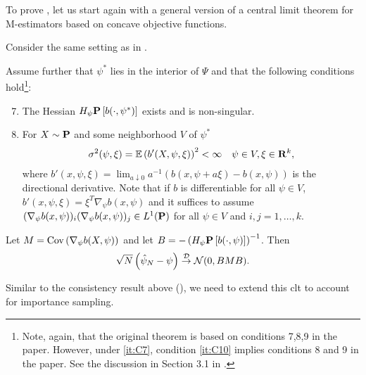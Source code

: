 To prove , let us start again with a general version of a central limit theorem for M-estimators based on concave objective functions. 
\begin{theorem}
    \label{thm:haberman-clt}
    Consider the same setting as in . 

    Assume further that $\psi^{\ast}$ lies in the interior of $\Psi$ and that the following conditions hold\footnote{Note, again, that the original theorem is based on conditions 7,8,9 in the paper. However, under \ref{it:C7}, condition \ref{it:C10} implies conditions 8 and 9 in the paper. See the discussion in Section 3.1 in \citep{Haberman1989Concavity}.}: 
    \begin{enumerate}[label=(C\arabic*),ref=(C\arabic*)]
        \setcounter{enumi}{6}
        \item\label{it:C7} The Hessian $H_{\psi} \P \left[ b(\cdot, \psi^{\ast}) \right]$ exists and is non-singular.
        \setcounter{enumi}{9}
        \item\label{it:C10} For $X\sim \P$ and some neighborhood $V$ of $\psi^{\ast}$ 
        \begin{align*}
            \sigma^{2}(\psi, \xi) = \mathbb E \left( b'(X, \psi, \xi)  \right)^{2} < \infty && \psi \in V, \xi \in \R^{k},
        \end{align*}
        where $b'(x, \psi, \xi) = \lim_{a \downarrow 0} a^{-1} \left( b(x, \psi + a\xi) - b(x, \psi)\right)$ is the directional derivative. Note that if $b$ is differentiable for all $\psi \in V$, $b'(x, \psi, \xi) = \xi^{T}\nabla_{\psi} b(x, \psi)$ and it suffices to assume $(\nabla_{\psi} b(x,\psi))_{i}(\nabla_{\psi} b(x,\psi))_{j} \in L^{1} (\P)$ for all $\psi \in V$ and $i,j = 1,\dots, k$.
    \end{enumerate}
    
    Let $M = \cov \left( \nabla_{\psi} b(X, \psi) \right)$ and let $B = - \left(H_{\psi} \P \left[ b(\cdot, \psi) \right]\right)^{-1}$. Then 
    \begin{equation}
        \sqrt{N} \left( \hat\psi_{N} - \psi \right) \convD \Normal (0, BMB).
    \end{equation}
    
\end{theorem}

Similar to the consistency result above (), we need to extend this \gls{clt} to account for importance sampling.

